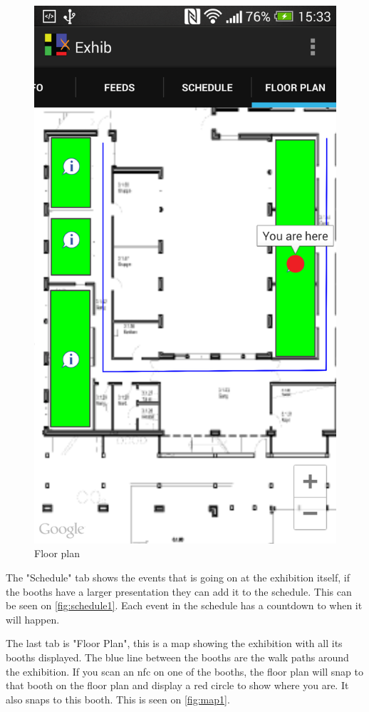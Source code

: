 \begin{figure}[H]
\begin{minipage}[b]{0.5\columnwidth}
\includegraphics[width=0.7\columnwidth]{img/finaldesign/map1.png}
\caption{Floor plan}
\label{fig:map1}
\end{minipage}
\end{figure}

The "Schedule" tab shows the events that is going on at the exhibition itself, if the booths have a larger presentation they can add it to the schedule. This can be seen on \autoref{fig:schedule1}. Each event in the schedule has a countdown to when it will happen. 

The last tab is "Floor Plan", this is a map showing the exhibition with all its booths displayed. The blue line between the booths are the walk paths around the exhibition. If you scan an \ac{nfc} on one of the booths, the floor plan will snap to that booth on the floor plan and display a red circle to show where you are. It also snaps to this booth. This is seen on \autoref{fig:map1}. 

